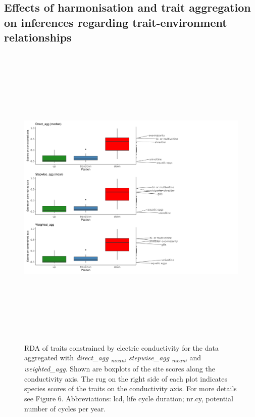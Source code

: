 \documentclass[12pt]{article}
\begin{document}
\newpage

\subsection*{Effects of harmonisation and trait aggregation on inferences regarding trait-environment relationships}
\label{sec:effects_harmonisation_trait_env_rel}

\begin{figure}[H]
    \centering
    \includegraphics[width=18.5cm, height=15cm]{boxplot_scores_combined_REMAIN_SI.png}
    \caption{RDA of traits constrained by electric conductivity for the data aggregated with \textit{direct\_agg \textsubscript{mean}}, \textit{stepwise\_agg \textsubscript{mean}}, and \textit{weighted\_agg}. Shown are boxplots of the site scores along the conductivity axis. The rug on the right side of each plot indicates species scores of the traits on the conductivity axis. For more details see Figure 6. %
    Abbreviations: lcd, life cycle duration; nr.cy, potential number of cycles per year.}
    \label{fig:boxplots_scores_on_constrained_axis_REMAIN}
\end{figure}
\end{document}
